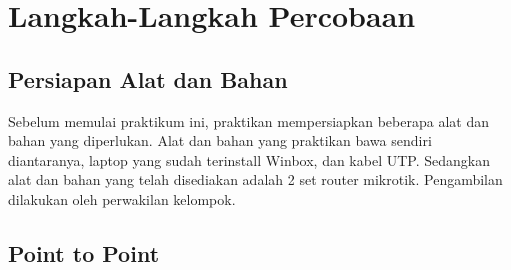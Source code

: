 \section{Langkah-Langkah Percobaan}
\subsection{Persiapan Alat dan Bahan}
Sebelum memulai praktikum ini, praktikan mempersiapkan beberapa alat dan bahan yang diperlukan. Alat dan bahan yang praktikan bawa sendiri diantaranya, laptop yang sudah terinstall Winbox, dan kabel UTP. Sedangkan alat dan bahan yang telah disediakan adalah 2 set router mikrotik. Pengambilan dilakukan oleh perwakilan kelompok.

\subsection{Point to Point}
